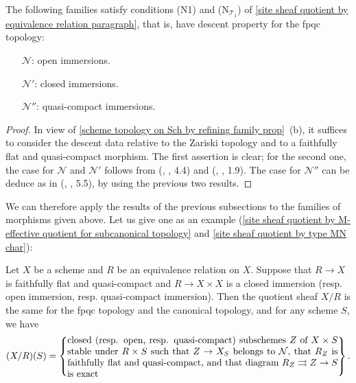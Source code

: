 \begin{proposition}\label{scheme morphism descent by fpqc eg}
The following families satisfy conditions (N1) and ($\text{N}_{\mathcal{T}_1}$) of \ref{site sheaf quotient by equivalence relation paragraph}, that is, have descent property for the fpqc topology:
\begin{enumerate}[leftmargin=35pt]
    \item[$\mathcal{N}$:] open immersions.
    \item[$\mathcal{N}'$:] closed immersions.
    \item[$\mathcal{N}''$:] quasi-compact immersions.
\end{enumerate}
\end{proposition}
\begin{proof}
In view of \cref{scheme topology on Sch by refining family prop}~(b), it suffices to consider the descent data relative to the Zariski topology and to a faithfully flat and quasi-compact morphism. The first assertion is clear; for the second one, the case for $\mathcal{N}$ and $\mathcal{N}'$ follows from (\cite{SGA1}, , 4.4) and (\cite{SGA1}, , 1.9). The case for $\mathcal{N}''$ can be deduce as in (\cite{SGA1}, , 5.5), by using the previous two results.
\end{proof}

We can therefore apply the results of the previous subsections to the families of morphisms given above. Let us give one as an example (\cref{site sheaf quotient by M-effective quotient for subcanonical topology} and \cref{site sheaf quotient by type MN char}):

\begin{corollary}\label{scheme quotient by fpqc equivalence relation prop}
Let $X$ be a scheme and $R$ be an equivalence relation on $X$. Suppose that $R\to X$ is faithfully flat and quasi-compact and $R\to X\times X$ is a closed immersion (resp. open immersion, resp. quasi-compact immersion). Then the quotient sheaf $X/R$ is the same for the fpqc topology and the canonical topology, and for any scheme $S$, we have
\[(X/R)(S)=\left\{\parbox{4in}{%
closed (resp. open, resp. quasi-compact) subschemes $Z$ of $X\times S$ stable under $R\times S$ such that $Z\to X_S$ belongs to $\mathcal{N}$, that $R_Z$ is faithfully flat and quasi-compact, and that diagram $R_Z\rightrightarrows Z\to S$ is exact%
}\right\}.\]
\end{corollary}

